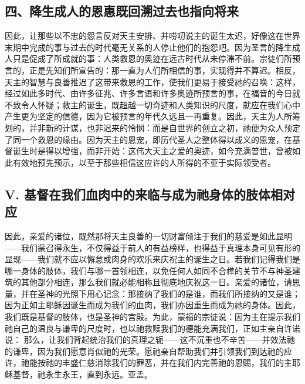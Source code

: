 
\subsection{四、降生成人的恩惠既回溯过去也指向将来}

因此，让那些以不忠的怨言反对天主安排、并唠叨说主的诞生太迟，好像这在世界末期中完成的事与过去的时代毫无关系的人停止他们的抱怨吧。因为圣言的降生成人只是促成了所成就的事：人类救恩的奥迹在远古时代从未停滞不前。宗徒们所预言的，正是先知们所宣告的：那一直为人们所相信的事，实现得并不算迟。相反，天主的智慧与良善推迟了这带来救恩的工作，使我们更易于接受祂的召唤：这样，经过如此多时代、由许多征兆、许多言语和许多奥迹所预言的事，在福音的今日就不致令人怀疑；救主的诞生，既超越一切奇迹和人类知识的尺度，就应在我们心中产生更为坚定的信德，因为它被预言的年代久远且一再重复。因此，天主为人所筹划的，并非新的计谋，也非迟来的怜悯：而是自世界的创立之初，祂便为众人预定了同一个救恩的缘由。因为天主的恩宠，即历代圣人之整体得以成义的恩宠，在基督诞生时是得以增强，而非开始：这伟大天主之爱的奥迹，如今充满普世，曾被如此有效地预先预示，以至于那些相信这应许的人所得的不亚于实际领受者。\par


\subsection{V. 基督在我们血肉中的来临与成为祂身体的肢体相对应}

因此，亲爱的诸位，既然那将天主良善的一切财富倾注于我们的慈爱是如此显明——我们蒙召得永生，不仅得益于前人的有益榜样，也得益于真理本身可见有形的显现——我们就不应以懈怠或肉身的欢乐来庆祝主的诞生之日。若我们记得我们是哪一身体的肢体，我们与哪一首领相连，以免任何人如同不合榫的关节不与神圣建筑的其他部分相连，那么我们就必能相称且彻底地庆祝这一日。亲爱的诸位，请思量，并在圣神的光照下用心记念：那接纳了我们的是谁，而我们所接纳的又是谁；因为正如主耶稣因诞生而成为我们的血肉，我们亦因重生而成为祂的身体。因此，我们既是基督的肢体，也是圣神的宫殿。为此，蒙福的宗徒说：因为主在提示我们祂自己的温良与谦卑的尺度时，也以祂救赎我们的德能充满我们，正如主亲自许诺说：  那么，让我们背起统治我们的真理之轭——这不沉重也不辛苦——并效法祂的谦卑，因为我们愿意肖似祂的光荣。愿祂亲自帮助我们并引领我们到达祂的应许，祂能按祂的丰盛仁慈消除我们的罪恶，并在我们内完善祂的恩赐，我们的主耶稣基督，祂永生永王，直到永远。亚孟。\par

